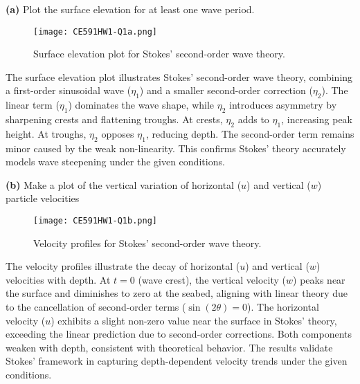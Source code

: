 \documentclass[a4paper]{article}
\begin{document}
\textbf{(a)} Plot the surface elevation for at least one wave period.
\begin{figure}[H]
    \centering
    \texttt{[image: CE591HW1-Q1a.png]}
    \caption{\small Surface elevation plot for Stokes' second-order wave theory.}
    \label{fig:plot2a}
\end{figure}
\vspace{0.3cm}

The surface elevation plot illustrates Stokes’ second-order wave theory, combining a first-order sinusoidal wave ($\eta_1$) and a smaller second-order correction ($\eta_2$). The linear term ($\eta_1$) dominates the wave shape, while $\eta_2$ introduces asymmetry by sharpening crests and flattening troughs. At crests, $\eta_2$ adds to $\eta_1$, increasing peak height. At troughs, $\eta_2$ opposes $\eta_1$, reducing depth. The second-order term remains minor caused by the weak non-linearity. This confirms Stokes’ theory accurately models wave steepening under the given conditions.
\vspace{0.3cm}

\textbf{(b)} Make a plot of the vertical variation of horizontal (\(u\)) and vertical (\(w\)) particle velocities
\begin{figure}[H]
    \centering
    \texttt{[image: CE591HW1-Q1b.png]}
    \caption{\small Velocity profiles for Stokes' second-order wave theory.}
    \label{fig:plot2b}
\end{figure}
\vspace{0.3cm}
The velocity profiles illustrate the decay of horizontal (\(u\)) and vertical (\(w\)) velocities with depth. At \(t = 0\) (wave crest), the vertical velocity (\(w\)) peaks near the surface and diminishes to zero at the seabed, aligning with linear theory due to the cancellation of second-order terms (\(\sin(2\theta) = 0\)). The horizontal velocity (\(u\)) exhibits a slight non-zero value near the surface in Stokes' theory, exceeding the linear prediction due to second-order corrections. Both components weaken with depth, consistent with theoretical behavior. The results validate Stokes' framework in capturing depth-dependent velocity trends under the given conditions.  
\end{document}
